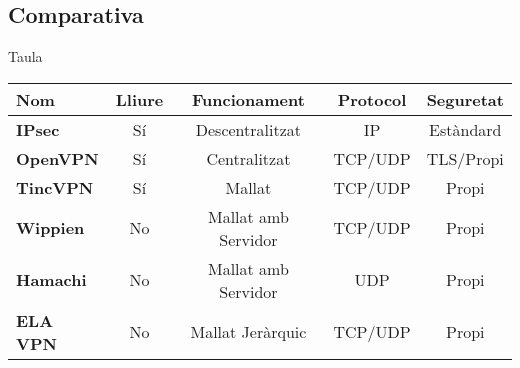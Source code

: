\subsection{Comparativa}
    \begin{frame}{Taula}
        \begin{center}
\begin{tabular}{|l|c|c|c|c|}
\hline
Nom & Lliure & Funcionament & Protocol & Seguretat \\ \hline \hline
\bf IPsec & Sí & Descentralitzat & IP & Estàndard \\ \hline
\bf OpenVPN & Sí & Centralitzat & TCP/UDP & TLS/Propi \\ \hline
\bf TincVPN & Sí & Mallat & TCP/UDP & Propi \\ \hline
\bf Wippien & No & Mallat amb Servidor & TCP/UDP & Propi \\ \hline
\bf Hamachi & No & Mallat amb Servidor & UDP & Propi \\ \hline
\bf ELA VPN & No & Mallat Jeràrquic & TCP/UDP & Propi \\ \hline
\end{tabular}
        \end{center}
    \end{frame}
